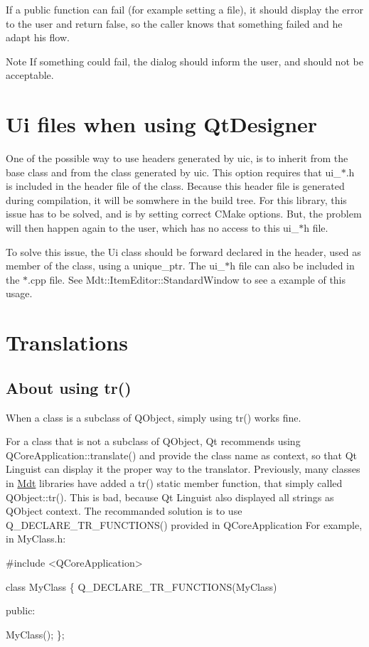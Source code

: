 If a public function can fail (for example setting a file), it should display the error to the user and return false, so the caller knows that something failed and he adapt his flow. \begin{DoxyNote}{Note}
If something could fail, the dialog should inform the user, and should not be acceptable.
\end{DoxyNote}
\hypertarget{guideline_page_ui_files}{}\section{Ui files when using Qt\+Designer}\label{guideline_page_ui_files}
One of the possible way to use headers generated by uic, is to inherit from the base class and from the class generated by uic. This option requires that ui\+\_\+$\ast$.h is included in the header file of the class. Because this header file is generated during compilation, it will be somwhere in the build tree. For this library, this issue has to be solved, and is by setting correct C\+Make options. But, the problem will then happen again to the user, which has no access to this ui\+\_\+$\ast$h file.

To solve this issue, the Ui class should be forward declared in the header, used as member of the class, using a unique\+\_\+ptr. The ui\+\_\+$\ast$h file can also be included in the $\ast$.cpp file. See Mdt\+::\+Item\+Editor\+::\+Standard\+Window to see a example of this usage.\hypertarget{guideline_page_translations}{}\section{Translations}\label{guideline_page_translations}
\hypertarget{guideline_page_translations_tr}{}\subsection{About using tr()}\label{guideline_page_translations_tr}
When a class is a subclass of Q\+Object, simply using tr() works fine.

For a class that is not a subclass of Q\+Object, Qt recommends using Q\+Core\+Application\+::translate() and provide the class name as context, so that Qt Linguist can display it the proper way to the translator. Previously, many classes in \hyperlink{namespace_mdt}{Mdt} libraries have added a tr() static member function, that simply called Q\+Object\+::tr(). This is bad, because Qt Linguist also displayed all strings as Q\+Object context. The recommanded solution is to use Q\+\_\+\+D\+E\+C\+L\+A\+R\+E\+\_\+\+T\+R\+\_\+\+F\+U\+N\+C\+T\+I\+O\+N\+S() provided in Q\+Core\+Application For example, in My\+Class.\+h\+: 
\begin{DoxyCode}
\textcolor{preprocessor}{#include <QCoreApplication>}

\textcolor{keyword}{class }MyClass
\{
  Q\_DECLARE\_TR\_FUNCTIONS(MyClass)

 public:

  MyClass();
\};
\end{DoxyCode}



